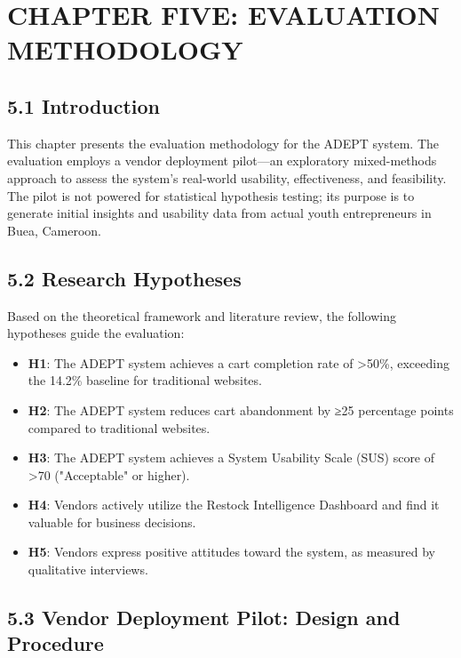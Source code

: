 \documentclass[12pt,a4paper]{article}
\begin{document}
\newpage

\section{CHAPTER FIVE: EVALUATION METHODOLOGY}

\subsection{5.1 Introduction}

This chapter presents the evaluation methodology for the ADEPT system. The evaluation employs a vendor deployment pilot---an exploratory mixed-methods approach to assess the system's real-world usability, effectiveness, and feasibility. The pilot is not powered for statistical hypothesis testing; its purpose is to generate initial insights and usability data from actual youth entrepreneurs in Buea, Cameroon.

\subsection{5.2 Research Hypotheses}

Based on the theoretical framework and literature review, the following hypotheses guide the evaluation:

\begin{itemize}
    \item \textbf{H1}: The ADEPT system achieves a cart completion rate of >50\%, exceeding the 14.2\% baseline for traditional websites.
    \item \textbf{H2}: The ADEPT system reduces cart abandonment by ≥25 percentage points compared to traditional websites.
    \item \textbf{H3}: The ADEPT system achieves a System Usability Scale (SUS) score of >70 ("Acceptable" or higher).
    \item \textbf{H4}: Vendors actively utilize the Restock Intelligence Dashboard and find it valuable for business decisions.
    \item \textbf{H5}: Vendors express positive attitudes toward the system, as measured by qualitative interviews.
\end{itemize}

\subsection{5.3 Vendor Deployment Pilot: Design and Procedure}
\end{document}
